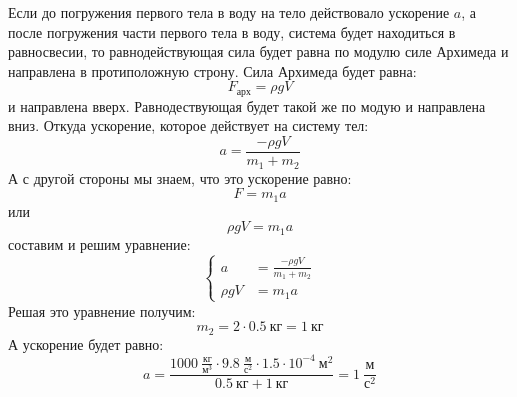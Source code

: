 \documentclass{minimal}
\begin{document}
    Если до погружения первого тела в воду на тело действовало ускорение $a$, а после погружения части первого тела в воду, система будет находиться в равносвесии, то равнодействующая сила будет равна по модулю силе Архимеда и направлена в протиположную строну. Сила Архимеда будет равна:
    $$F_{\mbox{арх}}=\rho g V$$ и направлена вверх. Равнодествующая будет такой же по модую и направлена вниз. Откуда ускорение, которое действует на систему тел: $$a=\frac{-\rho g V}{m_1 + m_2}$$
    А с другой стороны мы знаем, что это ускорение равно:
    $$F=m_1 a$$ или $$\rho g V=m_1 a$$ составим и решим уравнение:
    $$
    \begin{cases}
        a&=\frac{-\rho g V}{m_1 + m_2}\\
        \rho g V&=m_1 a
    \end{cases}
    $$
    Решая это уравнение получим:
    $$
      m_2 = 2 \cdot 0.5~\mbox{кг} = 1~\mbox{кг}
    $$
    А ускорение будет равно:
    $$
        a = \frac{1000~\frac{\mbox{кг}}{\mbox{м}^3} \cdot 9.8~\frac{\mbox{м}}{\mbox{с}^2} \cdot 1.5 \cdot 10^{-4}~\mbox{м}^2}{0.5~\mbox{кг} + 1~\mbox{кг}} = 1~\frac{\mbox{м}}{\mbox{с}^2}
    $$
\end{document}

